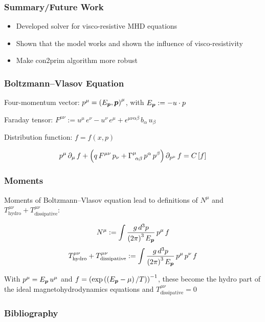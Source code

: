 \documentclass{beamer}
\begin{document}
\begin{frame}
\frametitle{Summary/Future Work}
  \begin{itemize}
    \item
      Developed solver for visco-resistive MHD equations
    \item
      Shown that the model works and shown the influence of visco-resistivity 
    \item
      Make con2prim algorithm more robust
  \end{itemize}
\end{frame}

\appendix

\begin{frame}
\frametitle{Boltzmann--Vlasov Equation}

  Four-momentum vector: $p^{\mu} = \left( E_{\boldsymbol{p}}, \boldsymbol{p} \right)^{\mu}$,
  with $E_{\boldsymbol{p}} := - u \cdot p$ \newline

  Faraday tensor: $F^{\mu\nu} := u^{\mu} \, e^{\nu} - u^{\nu} \, e^{\mu}
                     + \epsilon^{\mu\nu\alpha\beta} \, b_{\alpha} \, u_{\beta}$
  \newline

  Distribution function: $f = f\left( x, p \right)$

  \begin{equation}
    p^{\mu} \, \partial_{\mu} \, f
      + \left( q \, F^{\mu\nu} \, p_{\nu}
      + \Gamma^{\mu}_{~\alpha\beta} \, p^{\alpha} \, p^{\beta} \right)
      \partial_{p^{\mu}} \, f = C\left[ f \right]
  \end{equation}
  \cite{most2022}

\end{frame}

\begin{frame}
\frametitle{Moments}

  Moments of Boltzmann--Vlasov equation
  lead to definitions of $N^{\mu}$ and $T^{\mu\nu}_{\mathrm{hydro}}
  + T^{\mu\nu}_{\mathrm{dissipative}}$:

  \begin{equation}
    N^{\mu} := \int \frac{g \, d^{3}p}{\left(2\pi\right)^{3} E_{\boldsymbol{p}}} \,
    p^{\mu} \, f
  \end{equation}
  \begin{equation}
    T^{\mu\nu}_{\mathrm{hydro}} + T^{\mu\nu}_{\mathrm{dissipative}}
    := \int \frac{g \, d^{3}p}{\left(2\pi\right)^{3} E_{\boldsymbol{p}}} \,
    p^{\mu} \, p^{\nu} \, f
  \end{equation}
  \cite{denicol2019}\newline

  With $p^{\mu} = E_{\boldsymbol{p}} \, u^{\mu}$ and
  $f = \left( \exp \left( \left( E_{\boldsymbol{p}} - \mu \right) / T \right) \right)^{-1}$,
  these become the hydro part of the ideal magnetohydrodynamics equations
  and $T^{\mu\nu}_{\mathrm{dissipative}} = 0$

\end{frame}

\begin{frame}
\frametitle{Bibliography}

  \Fontvi
  

\end{frame}
\end{document}
